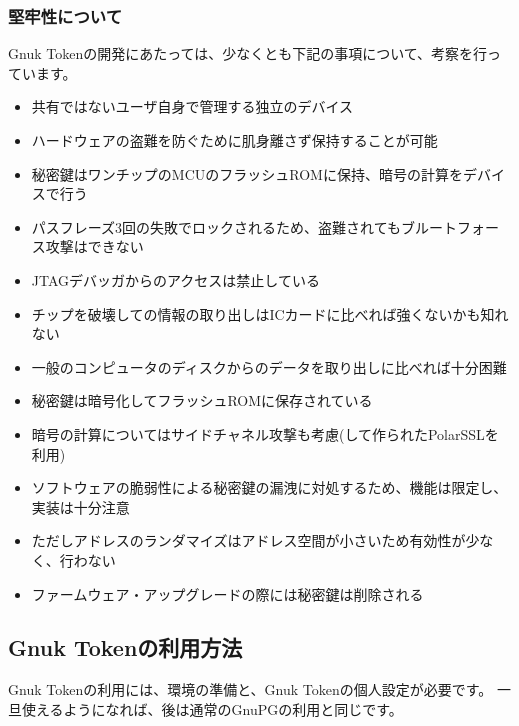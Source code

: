 \documentclass[mingoth,a4paper,twoside]{jsarticle}
\begin{document}

\subsubsection{堅牢性について}
Gnuk Tokenの開発にあたっては、少なくとも下記の事項について、考察を行っています。

\begin{itemize}
\item 共有ではないユーザ自身で管理する独立のデバイス
\item ハードウェアの盗難を防ぐために肌身離さず保持することが可能
\item 秘密鍵はワンチップのMCUのフラッシュROMに保持、暗号の計算をデバイスで行う
\item パスフレーズ3回の失敗でロックされるため、盗難されてもブルートフォース攻撃はできない
\item JTAGデバッガからのアクセスは禁止している
\item チップを破壊しての情報の取り出しはICカードに比べれば強くないかも知れない
\item 一般のコンピュータのディスクからのデータを取り出しに比べれば十分困難
\item 秘密鍵は暗号化してフラッシュROMに保存されている
\item 暗号の計算についてはサイドチャネル攻撃も考慮(して作られたPolarSSLを利用)
\item ソフトウェアの脆弱性による秘密鍵の漏洩に対処するため、機能は限定し、実装は十分注意
\item ただしアドレスのランダマイズはアドレス空間が小さいため有効性が少なく、行わない
\item ファームウェア・アップグレードの際には秘密鍵は削除される
\end{itemize}


\subsection{Gnuk Tokenの利用方法}
%
Gnuk Tokenの利用には、環境の準備と、Gnuk Tokenの個人設定が必要です。
一旦使えるようになれば、後は通常のGnuPGの利用と同じです。
\end{document}
